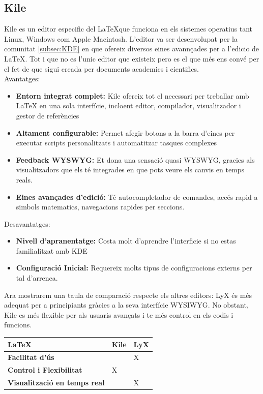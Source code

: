 \subsection{Kile}
Kile es un editor especific del \LaTeX que funciona en els sistemes operatius tant Linux, Windows com Apple Macintosh. L'editor va ser desenvolupat per la comunitat  \ref{subsec:KDE} en que ofereix diversos eines avannçades per a l'edicio de LaTeX. Tot i que no es l'unic editor que existeix pero es el que més ens convé per el fet de que sigui creada per documents academics i cientifics.\\

Avantatges:
\begin{itemize}
\item \textbf{Entorn integrat complet:} Kile ofereix tot el necessari per treballar amb LaTeX en una sola interfície, incloent editor, compilador, visualitzador i gestor de referències
\item \textbf{Altament configurable: } Permet afegir botons a la barra d'eines per executar scripts personalitzats i automatitzar tasques complexes
\item \textbf{Feedback WYSWYG:} Et dona una sensació quasi WYSWYG, gracies als visualitzadors que els té integrades en que pots veure els canvis en temps reals.
\item \textbf{Eines avançades d'edició:} Té autocompletador de comandes, accés rapid a simbols matematics, navegacions rapides per seccions.
\end{itemize}
Desavantatges:
\begin{itemize}
\item \textbf{Nivell d'apranentatge:} Costa molt d'aprendre l'interficie si no estas familialitzat amb KDE
\item \textbf{Configuració Inicial:} Requereix molts tipus de configuracions externs per tal d'arrenca.
\end{itemize}

Ara mostrarem una taula de comparació respecte els altres editors:
LyX és més adequat per a principiants gràcies a la seva interfície WYSIWYG. No obstant, Kile es més flexible per als usuaris avançats i te més control en els codis i funcions. \\
\begin{table}[h!]
 \begin{tabular}{|l|l|l|}
\hline
 \LaTeX & \textbf{Kile} & \textbf{LyX} \\ \hline
 \textbf{Facilitat d'ús} &  & X \\ \hline
 \textbf{Control i Flexibilitat} & X & \\ \hline
 \textbf{Visualització en temps real} & & X \\ \hline
\end{tabular}
\end{table}

